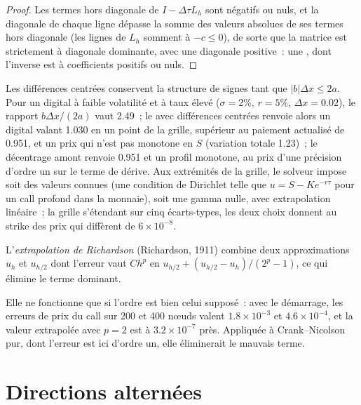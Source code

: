 \begin{proof}
Les termes hors diagonale de $I - \Delta\tau L_h$ sont négatifs ou nuls, et la diagonale de chaque ligne dépasse la somme des valeurs absolues de ses termes hors diagonale (les lignes de $L_h$ somment à $-c \le 0$), de sorte que la matrice
est strictement à diagonale dominante, avec une diagonale positive~: une , dont l'inverse est à coefficients positifs ou nuls.
\end{proof}

Les différences centrées conservent la structure de signes tant que $|b|\Delta x \le 2a$. Pour un digital à faible volatilité et à taux élevé ($\sigma = 2\%$, $r = 5\%$, $\Delta x = 0.02$), le rapport $b\Delta x/(2a)$ vaut 2.49~; le 
avec différences centrées renvoie alors un digital valant 1.030 en un point de la grille, supérieur au paiement actualisé de 0.951, et un prix qui n'est pas monotone en $S$ (variation totale 1.23)~;
le décentrage amont renvoie 0.951 et un profil monotone, au prix d'une précision d'ordre un sur le terme de dérive. Aux extrémités de la grille, le solveur impose soit des valeurs connues (une condition de Dirichlet telle que
$u = S - Ke^{-r\tau}$ pour un call profond dans la monnaie), soit une gamma nulle, avec extrapolation linéaire~; la grille s'étendant sur cinq écarts-types, les deux choix donnent au strike des prix qui diffèrent de $6 \times 10^{-8}$.

\begin{definition}\label{def:qm:finite-difference-methods:rich}
L'\emph{extrapolation de Richardson} (Richardson, 1911) combine deux approximations $u_h$ et $u_{h/2}$ dont l'erreur vaut $Ch^p$ en $u_{h/2} + (u_{h/2} - u_h)/(2^p - 1)$, ce qui
élimine le terme dominant.
\end{definition}

Elle ne fonctionne que si l'ordre est bien celui supposé~: avec le démarrage, les erreurs de prix du call sur 200 et 400 nœuds valent $1.8 \times 10^{-3}$ et $4.6 \times 10^{-4}$, et la valeur extrapolée avec $p =
2$ est à $3.2 \times 10^{-7}$ près. Appliquée à Crank--Nicolson pur, dont l'erreur est ici d'ordre un, elle éliminerait le mauvais terme.

\section{Directions alternées}


